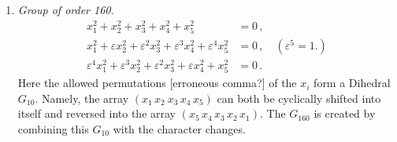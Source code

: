 \documentclass[leqno]{article}
\begin{document}
\begin{enumerate}[label=\arabic*)]
    \item \textit{Group of order 160.}
    \begin{align*}
    	x_1^2 + x_2^2 + x_3^2 + x_4^2 + x_5^2 &= 0 \, , \\
    	x_1^2 + \varepsilon x_2^2 + \varepsilon^2 x_3^2 + \varepsilon^3 x_4^2 + \varepsilon^4 x_5^2 &= 0 \, , \quad (\varepsilon^5=1.) \\
    	\varepsilon^4 x_1^2 + \varepsilon^3 x_2^2 + \varepsilon^2 x_3^2 + \varepsilon x_4^2 + x_5^2 &=0 \, . 
    \end{align*}
    Here the allowed permutations [erroneous comma?] of the $x_i$ form a Dihedral $G_{10}$. Namely, the array $(x_1 \, x_2 \ x_3 \, x_4 \, x_5)$ can both be cyclically shifted into itself and reversed into the array $(x_5 \, x_4 \, x_3 \, x_2 \, x_1)$. The $G_{160}$ is created by combining this $G_{10}$ with the character changes.
\end{enumerate}

\end{document}
